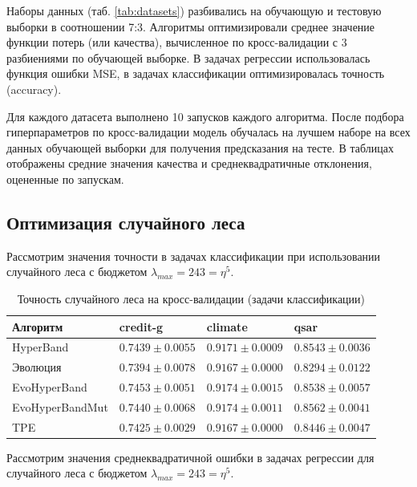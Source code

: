 \documentclass[a4paper,12pt]{article}
\begin{document}
Наборы данных (таб. \ref{tab:datasets}) разбивались на обучающую и тестовую выборки в соотношении 7:3. Алгоритмы оптимизировали среднее значение функции потерь (или качества), вычисленное по кросс-валидации с 3 разбиениями по обучающей выборке. В задачах регрессии использовалась функция ошибки MSE, в задачах классификации оптимизировалась точность (accuracy).

Для каждого датасета выполнено 10 запусков каждого алгоритма. После подбора гиперпараметров по кросс-валидации модель обучалась на лучшем наборе на всех данных обучающей выборки для получения предсказания на тесте. В таблицах отображены средние значения качества и среднеквадратичные отклонения, оцененные по запускам.

\subsection{Оптимизация случайного леса}

Рассмотрим значения точности в задачах классификации при использовании случайного леса с бюджетом $\lambda_{max}=243=\eta^5$.
\begin{table}[h]
\centering
\begin{tabular}{|l|l|l|l|}
\hline
Алгоритм               & credit-g                     & climate                      & qsar                         \\ \hline
HyperBand              & $0.7439 \pm 0.0055$          & $0.9171 \pm 0.0009$          & $0.8543 \pm 0.0036$          \\ \hline
Эволюция               & $0.7394 \pm 0.0078$          & $0.9167 \pm 0.0000$          & $0.8294 \pm 0.0122$          \\ \hline
EvoHyperBand           & $\mathbf{0.7453 \pm 0.0051}$ & $0.9174 \pm 0.0015$          & $0.8538 \pm 0.0057$          \\ \hline
EvoHyperBandMut & $0.7440 \pm 0.0068$          & $\mathbf{0.9174 \pm 0.0011}$ & $\mathbf{0.8562 \pm 0.0041}$ \\ \hline
TPE                    & $0.7425 \pm 0.0029$          & $0.9167 \pm 0.0000$          & $0.8446 \pm 0.0047$           \\ \hline
\end{tabular}
\caption{Точность случайного леса на кросс-валидации (задачи классификации)}
\label{tab:rf1}
\end{table}
\par

Рассмотрим значения среднеквадратичной ошибки в задачах регрессии для случайного леса с бюджетом $\lambda_{max}=243=\eta^5$.
\end{document}
